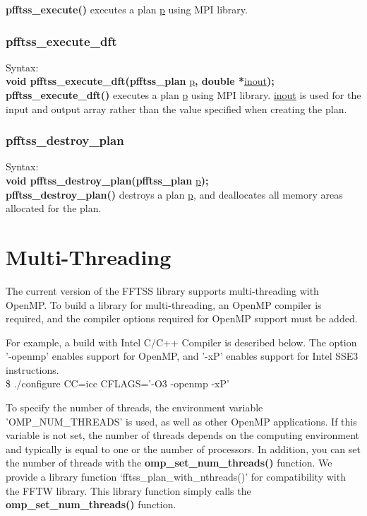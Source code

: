 \documentclass{article}
\begin{document}
{\bf pfftss\_execute()} executes a plan \underline{p} using MPI library.


\subsubsection{pfftss\_execute\_dft}
Syntax:\\
{\bf void pfftss\_execute\_dft(pfftss\_plan }\underline{p}{\bf, double *}\underline{inout}{\bf);}\\

{\bf pfftss\_execute\_dft()} executes a plan \underline{p} using MPI library.
\underline{inout} is used for the input and output array rather than the
value specified when creating the plan.

\subsubsection{pfftss\_destroy\_plan}
Syntax:\\
{\bf void pfftss\_destroy\_plan(pfftss\_plan }\underline{p}{\bf);}\\

{\bf pfftss\_destroy\_plan()} destroys a plan \underline{p}, and
deallocates all memory areas allocated for the plan.

\section{Multi-Threading}
The current version of the FFTSS library supports multi-threading with OpenMP.
To build a library for multi-threading, an OpenMP compiler is required,
and the compiler options required for OpenMP support must be added.

For example, a build with Intel C/C++ Compiler is described below.
The option '-openmp' enables support for OpenMP, and
'-xP' enables support for Intel SSE3 instructions.\\
\$ ./configure CC=icc CFLAGS='-O3 -openmp -xP'

To specify the number of threads, the environment variable 
'OMP\_NUM\_THREADS' is used, as well as other OpenMP applications.
If this variable is not set, the number of threads depends on the
computing environment and typically is equal to one or the 
number of processors. In addition, you can set the number of threads with the 
{\bf omp\_set\_num\_threads()} function. We provide a library function `fftss\_plan\_with\_nthreads()' for compatibility with the FFTW library. This library function simply calls the {\bf omp\_set\_num\_threads()} function.
\end{document}
